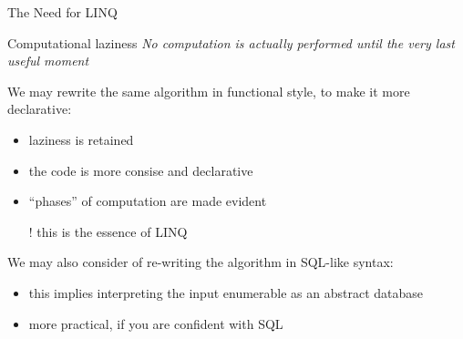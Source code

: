 \documentclass[presentation]{beamer}
\begin{document}
\begin{frame}[allowframebreaks]{The Need for LINQ}
  \begin{block}{Computational laziness}\centering\itshape
    No computation is actually performed until the very last useful moment
  \end{block}

  \framebreak

  We may rewrite the same algorithm in functional style, to make it more declarative:
  \begin{itemize}
    \item laziness is retained
    \item the code is more consise and declarative
    \item ``phases'' of computation are made evident
    \item[!] this is the essence of LINQ
  \end{itemize}

  \framebreak

  We may also consider of re-writing the algorithm in SQL-like syntax:
  \begin{itemize}
    \item this implies interpreting the input enumerable as an abstract database
    \item more practical, if you are confident with SQL
  \end{itemize}
\end{frame}
\end{document}
